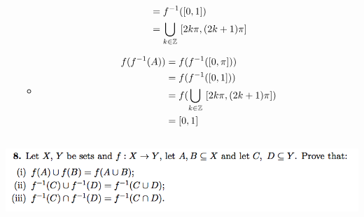 \documentclass[12pt]{article}
\begin{document}
\begin{mdframed}
\begin{enumerate}[label=(\roman*)]
\begin{itemize}
\begin{align*}
        &= f^{-1}([0, 1])\\
        &= \bigcup_{k \in \mathbb{Z}} ~[2k\pi, (2k + 1)\pi]
      \end{align*}
    \item
      \begin{align*}
        f(f^{-1}(A))
        &= f(f^{-1}([0, \pi]))\\
        &= f(f^{-1}([0, 1]))\\
        &= f(\bigcup_{k \in \mathbb{Z}} ~[2k\pi, (2k + 1)\pi])\\
        &= [0,1]
      \end{align*}
    \end{itemize}
  \end{enumerate}
\end{mdframed}

\newpage
\subsection*{} %
\includegraphics[width=400pt]{img/iulm-1-8.png}
\end{document}

